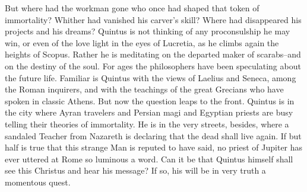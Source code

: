 But where had the workman gone who once had shaped that token of
immortality?  Whither had vanished his carver's skill?  Where had
disappeared his projects and his dreams?  Quintus is not thinking
of any proconsulship he may win, or even of the love light in the
eyes of Lucretia, as he climbs again the heights of Scopus.  Rather
he is meditating on the departed maker of scarabs--and on the
destiny of the soul.  For ages the philosophers have been
speculating about the future life.  Familiar is Quintus with the
views of Laelius and Seneca, among the Roman inquirers, and with
the teachings of the great Grecians who have spoken in classic
Athens.  But now the question leaps to the front.  Quintus is in
the city where Ayran travelers and Persian magi and Egyptian
priests are busy telling their theories of immortality.  He is in
the very streets, besides, where a sandaled Teacher from Nazareth
is declaring that the dead shall live again.  If but half is true
that this strange Man is reputed to have said, no priest of Jupiter
has ever uttered at Rome so luminous a word.  Can it be that
Quintus himself shall see this Christus and hear his message?  If
so, his will be in very truth a momentous quest.